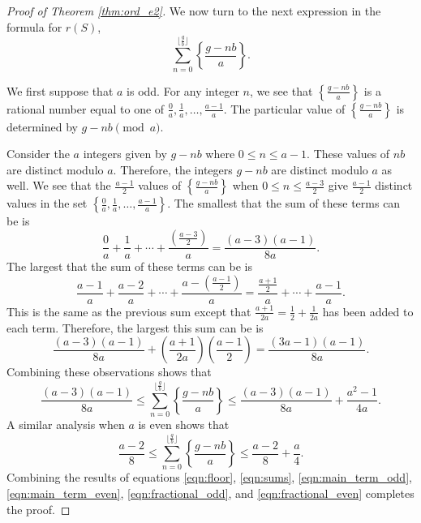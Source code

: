 \documentclass[12pt]{amsart}
\theoremstyle{plain}\newtheorem{proposition}{Proposition}[section]
\begin{document}
\begin{proof}[Proof of Theorem \ref{thm:ord_e2}]
We now turn to the next expression in the formula for $r(S)$,
\[
\sum_{n=0}^{\lfloor\frac{g}{b}\rfloor} \left\{\frac{g-nb}{a} \right\}.
\]

We first suppose that $a$ is odd. For any integer $n$, we see that $\left\{\frac{g-nb}{a}\right\}$ is a rational number equal to one of $\frac{0}{a},\frac{1}{a},\ldots, \frac{a-1}{a}$. The particular value of $\left\{\frac{g-nb}{a}\right\}$ is determined by $g-nb \pmod{a}$.

Consider the $a$ integers given by $g-nb$ where $0 \le n \le a-1$.  These values of $nb$ are distinct modulo $a$. Therefore, the integers $g-nb$ are distinct modulo $a$ as well.  We see that the $\frac{a-1}{2}$ values of $\left\{\frac{g-nb}{a}\right\}$ when $0 \le n \le \frac{a-3}{2}$ give $\frac{a-1}{2}$ distinct values in the set $\left\{\frac{0}{a},\frac{1}{a},\ldots, \frac{a-1}{a}\right\}$.  The smallest that the sum of these terms can be is 
\[
\frac{0}{a} + \frac{1}{a} + \cdots + \frac{\left(\frac{a-3}{2}\right)}{a} = \frac{(a-3)(a-1)}{8a}.
\]
The largest that the sum of these terms can be is 
\[
\frac{a-1}{a} + \frac{a-2}{a} + \cdots + \frac{a-\left(\frac{a-1}{2}\right)}{a} = 
\frac{\frac{a+1}{2}}{a}+ \cdots + \frac{a-1}{a}.
\]
This is the same as the previous sum except that $\frac{a+1}{2a} = \frac{1}{2} + \frac{1}{2a}$ has been added to each term.  Therefore,  the largest this sum can be is 
\[
\frac{(a-3)(a-1)}{8a} + \left(\frac{a+1}{2a}\right) \left( \frac{a-1}{2}\right) = \frac{(3a-1)(a-1)}{8a}.
\]
Combining these observations shows that 
\begin{equation}\label{eqn:fractional_odd}
 \frac{(a-3)(a-1)}{8a} \le \sum_{n=0}^{\lfloor\frac{g}{b}\rfloor} \left\{\frac{g-nb}{a} \right\} \le  \frac{(a-3)(a-1)}{8a} + \frac{a^2-1}{4a}.
\end{equation}
A similar analysis when $a$ is even shows that
\begin{equation}\label{eqn:fractional_even}
\frac{a-2}{8} \le \sum_{n=0}^{\lfloor\frac{g}{b}\rfloor} \left\{\frac{g-nb}{a} \right\} \le \frac{a-2}{8} + \frac{a}{4}.
\end{equation}
Combining the results of equations \eqref{eqn:floor}, \eqref{eqn:sums}, \eqref{eqn:main_term_odd}, \eqref{eqn:main_term_even}, \eqref{eqn:fractional_odd}, and \eqref{eqn:fractional_even} completes the proof.
\end{proof}
\end{document}
